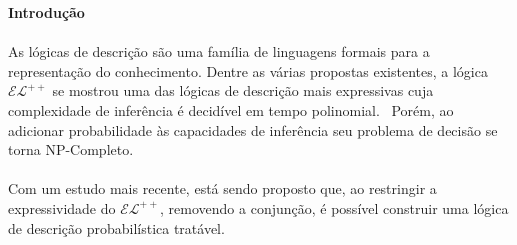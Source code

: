 \documentclass[portrait]{ppgcaposter}
\newcommand{\elpp}{\mathcal{EL}^{++}}
\begin{document}
\begin{multicols}{2} %

    \color{black}


    \begin{mdframed}[style=MyFrame]
        \begin{center}
            \huge  \textbf{Introdução}
        \end{center}
    \end{mdframed}
    \paragraph{}
    As lógicas de descrição são uma família de linguagens formais para a representação do conhecimento. Dentre as várias propostas existentes, a lógica $\elpp$ se mostrou uma das lógicas de descrição mais expressivas cuja complexidade de inferência é decidível em tempo polinomial.~\cite{Baader2005a} Porém, ao adicionar probabilidade às capacidades de inferência seu problema de decisão se torna NP-Completo.~\cite{Fin2019b}
    \paragraph{}
    Com um estudo mais recente, está sendo proposto que, ao restringir a expressividade do $\elpp$, removendo a conjunção, é possível construir uma lógica de descrição probabilística tratável.

\end{multicols}
\end{document}
